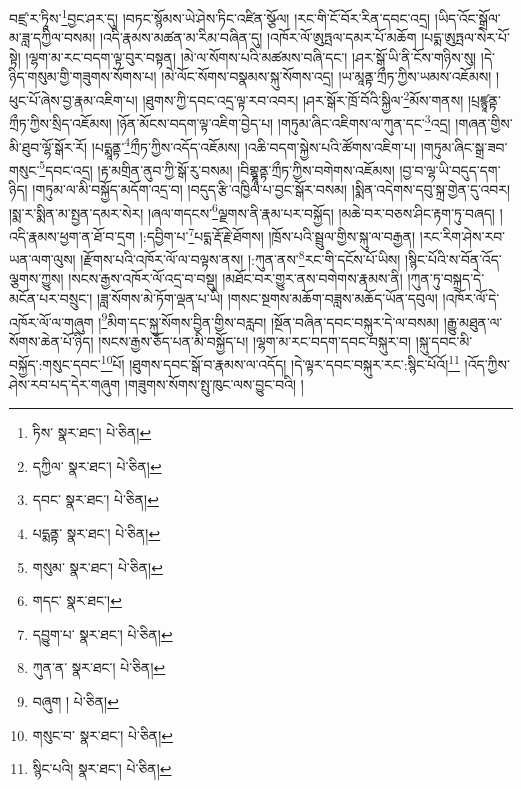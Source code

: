 བཛྲ་ར་ཏཱིས་\footnote{ཏིས་  སྣར་ཐང་།  པེ་ཅིན། }བྱང་ཤར་དུ། །བཏང་སྙོམས་ཡེ་ཤེས་ཏིང་འཛིན་སྩོལ། །རང་གི་ངོ་བོར་རིན་དབང་འདྲ། །ཡིད་འོང་སྒྲོལ་མ་ཟླ་དཀྱིལ་བསམ། །འདི་རྣམས་མཚན་མ་རིམ་བཞིན་དུ། །འཁོར་ལོ་ཨུཏྤལ་དམར་པོ་མཆོག །པདྨ་ཨུཏྤལ་སེར་པོ་སྟེ། །ལྷག་མ་རང་བདག་ལྟ་བུར་བསྟན། །མེ་ལ་སོགས་པའི་མཚམས་བཞི་དང་། །ཤར་སྒོ་ཡི་ནི་ངོས་གཉིས་སུ། །དེ་ཉིད་གསུམ་གྱི་གཟུགས་སོགས་པ། །མེ་ལོང་སོགས་བསྣམས་སྐུ་སོགས་འདྲ། །ཡ་མཱནྟ་ཀྲྀཏ་ཀྱིས་ཡམས་འཇོམས། །ཕུང་པོ་ཞེས་བྱ་རྣམ་འཇིག་པ། །ཐུགས་ཀྱི་དབང་འདྲ་ལྟ་རབ་འབར། །ཤར་སྒོར་ཁྲོ་བོའི་སྐྱིལ་\footnote{དཀྱིལ་  སྣར་ཐང་།  པེ་ཅིན། }མོས་གནས། །པྲཛྙཱནྟ་ཀྲྀཏ་ཀྱིས་སྲིད་འཇོམས། །ཉོན་མོངས་བདག་ལྟ་འཇིག་བྱེད་པ། །གཏུམ་ཞིང་འཇིགས་ལ་ཀུན་དང་\footnote{དབང་  སྣར་ཐང་།  པེ་ཅིན། }འདྲ། །གཞན་གྱིས་མི་ཐུབ་ལྷོ་སྒོར་རོ། །པདྨཱནྟ་\footnote{པདྨནྟ་  སྣར་ཐང་།  པེ་ཅིན། }ཀྲྀཏ་ཀྱིས་འདོད་འཇོམས། །འཆི་བདག་སྐྱེས་པའི་ཚོགས་འཇིག་པ། །གཏུམ་ཞིང་སྒྲ་ཟབ་གསུང་\footnote{གསུམ་  སྣར་ཐང་།  པེ་ཅིན། }དབང་འདྲ། །རྟ་མགྲིན་ནུབ་ཀྱི་སྒོ་རུ་བསམ། །བིགྷྣཱནྟ་ཀྲྀཏ་ཀྱིས་བགེགས་འཇོམས། །བྱ་བ་ལྷ་ཡི་བདུད་དག་ཉིད། །གཏུམ་ལ་མི་བསྐྱོད་མདོག་འདྲ་བ། །བདུད་རྩི་འཁྱིལ་པ་བྱང་སྒོར་བསམ། །སྨིན་འདེགས་དབུ་སྐྲ་གྱེན་དུ་འབར། །སྨ་ར་སྨིན་མ་སྤྱན་དམར་སེར། །ཞལ་གདངས་\footnote{གདང་  སྣར་ཐང་། }ལྗགས་ནི་རྣམ་པར་བསྐྱོད། །མཆེ་བར་བཅས་ཤིང་རྟག་ཏུ་བཞད། །འདི་རྣམས་ཕྱག་ན་ཐོ་བ་དྲག །:དབྱིག་པ་\footnote{དབྱུག་པ་  སྣར་ཐང་།  པེ་ཅིན། }པདྨ་རྡོ་རྗེ་ཐོགས། །ཁྲོས་པའི་སྦྲུལ་གྱིས་སྐུ་ལ་བརྒྱན། །རང་རིག་ཤེས་རབ་ཡན་ལག་ལུས། །རྫོགས་པའི་འཁོར་ལོ་ལ་བལྟས་ནས། །:ཀུན་ནས་\footnote{ཀུན་ན་  སྣར་ཐང་།  པེ་ཅིན། }རང་གི་དངོས་པོ་ཡིས། །སྙིང་པོའི་ས་བོན་འོད་ལྕགས་ཀྱུས། །སངས་རྒྱས་འཁོར་ལོ་འདྲ་བ་བསྡུ། །མཐོང་བར་གྱུར་ནས་བགེགས་རྣམས་ནི། །ཀུན་ཏུ་བསྐྲད་དེ་མངོན་པར་བསྲུང་། །ཟླ་སོགས་མེ་ཏོག་ལྡན་པ་ཡི། །གསང་སྔགས་མཆོག་བཟླས་མཆོད་ཡོན་དབུལ། །འཁོར་ལོ་དེ་འཁོར་ལོ་ལ་གཞུག །\footnote{བཞུག །  པེ་ཅིན། }མིག་དང་སྐུ་སོགས་བྱིན་གྱིས་བརླབ། །སྔོན་བཞིན་དབང་བསྐུར་དེ་ལ་བསམ། །རྒྱུ་མཐུན་ལ་སོགས་ཆེན་པོ་ཉིད། །སངས་རྒྱས་ཅོད་པན་མི་བསྐྱོད་པ། །ལྷག་མ་རང་བདག་དབང་བསྐུར་བ། །སྐུ་དབང་མི་བསྐྱོད་:གསུང་དབང་\footnote{གསུང་བ་  སྣར་ཐང་།  པེ་ཅིན། }པོ། །ཐུགས་དབང་སྒོ་བ་རྣམས་ལ་འདོད། །དེ་ལྟར་དབང་བསྐུར་རང་:སྙིང་པོའོ།\footnote{སྙིང་པའི།  སྣར་ཐང་།  པེ་ཅིན། } །འོད་ཀྱིས་ཤེས་རབ་པད་དེར་གཞུག །གཟུགས་སོགས་སྤུ་ཁུང་ལས་བྱུང་བའི། །
